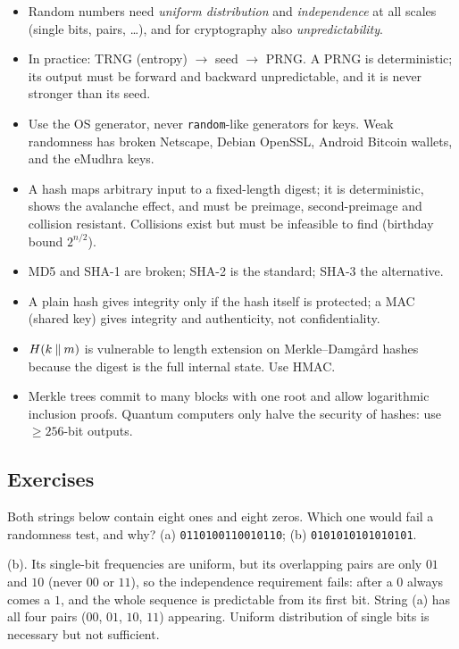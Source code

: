 \begin{summary}
\begin{itemize}
    \item Random numbers need \emph{uniform distribution} and \emph{independence} at all scales (single bits, pairs, \dots), and for cryptography also \emph{unpredictability}.
    \item In practice: TRNG (entropy) $\to$ seed $\to$ PRNG. A PRNG is deterministic; its output must be forward and backward unpredictable, and it is never stronger than its seed.
    \item Use the OS generator, never \texttt{random}-like generators for keys. Weak randomness has broken Netscape, Debian OpenSSL, Android Bitcoin wallets, and the eMudhra keys.
    \item A hash maps arbitrary input to a fixed-length digest; it is deterministic, shows the avalanche effect, and must be preimage, second-preimage and collision resistant. Collisions exist but must be infeasible to find (birthday bound $2^{n/2}$).
    \item MD5 and SHA-1 are broken; SHA-2 is the standard; SHA-3 the alternative.
    \item A plain hash gives integrity only if the hash itself is protected; a MAC (shared key) gives integrity and authenticity, not confidentiality.
    \item $H(k \mathbin{\|} m)$ is vulnerable to length extension on Merkle--Damgård hashes because the digest is the full internal state. Use HMAC.
    \item Merkle trees commit to many blocks with one root and allow logarithmic inclusion proofs. Quantum computers only halve the security of hashes: use $\geq 256$-bit outputs.
\end{itemize}
\end{summary}

\subsection*{Exercises}

\begin{exercise}
Both strings below contain eight ones and eight zeros. Which one would fail a randomness test, and why? (a) \texttt{0110100110010110}; (b) \texttt{0101010101010101}.
\end{exercise}
\begin{solution}
(b). Its single-bit frequencies are uniform, but its overlapping pairs are only $01$ and $10$ (never $00$ or $11$), so the independence requirement fails: after a $0$ always comes a $1$, and the whole sequence is predictable from its first bit. String (a) has all four pairs ($00$, $01$, $10$, $11$) appearing. Uniform distribution of single bits is necessary but not sufficient.
\end{solution}

